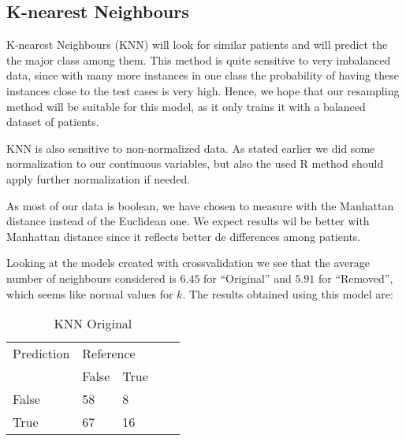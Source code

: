 \subsection{K-nearest Neighbours}

K-nearest Neighbours (KNN) will look for similar patients and will predict the the major class among them. This method is quite sensitive to very imbalanced data, since with many more instances in one class the probability of having these instances close to the test cases is very high. Hence, we hope that our resampling method will be suitable for this model, as it only trains it with a balanced dataset of patients.

KNN is also sensitive to non-normalized data. As stated earlier we did some normalization to our continuous variables, but also the used R method should apply further normalization if needed.

As most of our data is boolean, we have chosen to measure with the Manhattan distance instead of the Euclidean one. We expect results wil be better with Manhattan distance since it reflects better de differences among patients.


Looking at the models created with crossvalidation we see that the average number of neighbours considered is \(6.45\) for ``Original'' and \(5.91\) for ``Removed'', which seems like normal values for \(k\). The results obtained using this model are:

\begin{table}[!htbp]
\centering
\caption{KNN Original}
\vspace{0.1cm}
\label{knn-orig}
\begin{tabular}{|l|ll|ll}
\cline{1-3}
Prediction & \multicolumn{2}{l|}{Reference} &  &  \\
           & False          & True          &  &  \\ \cline{2-3}
False      & 58              & 8             &  &  \\
True       & 67              & 16             &  &  \\ \cline{1-3}
\end{tabular}
\end{table}

